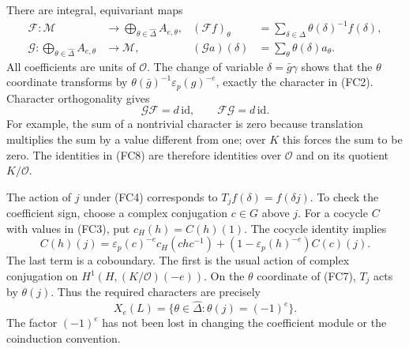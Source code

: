 There are integral, equivariant maps
\[
 \begin{aligned}
 \mathcal F:\mathcal M&\longrightarrow
                         \bigoplus_{\theta\in\widehat\Delta}A_{e,\theta},
 &(\mathcal F f)_\theta
       &=\sum_{\delta\in\Delta}\theta(\delta)^{-1}f(\delta),\\
 \mathcal G:\bigoplus_{\theta\in\widehat\Delta}A_{e,\theta}
                 &\longrightarrow\mathcal M,
 &(\mathcal G a)(\delta)&=\sum_\theta\theta(\delta)a_\theta.
 \end{aligned}                                                 \tag{FC7}
\]
All coefficients are units of $\mathcal O$. The change of
variable $\delta=\bar g\gamma$ shows that the $\theta$
coordinate transforms by
$\theta(\bar g)^{-1}\varepsilon_p(g)^{-e}$, exactly the
character in (FC2). Character orthogonality gives
\[
                    \mathcal G\mathcal F=d\,\mathrm{id},
             \qquad \mathcal F\mathcal G=d\,\mathrm{id}.
                                                               \tag{FC8}
\]
For example, the sum of a nontrivial character is zero
because translation multiplies the sum by a value different
from one; over $K$ this forces the sum to be zero. The
identities in (FC8) are therefore identities over
$\mathcal O$ and on its quotient $K/\mathcal O$.

The action of $j$ under (FC4) corresponds to
$T_jf(\delta)=f(\delta j)$. To check the coefficient sign,
choose a complex conjugation $c\in G$ above $j$.
For a cocycle $C$ with values in (FC3), put
$c_H(h)=C(h)(1)$. The cocycle identity implies
\[
 C(h)(j)=\varepsilon_p(c)^{-e}c_H(chc^{-1})
                      +(1-\varepsilon_p(h)^{-e})C(c)(j).
                                                               \tag{FC9}
\]
The last term is a coboundary. The first is the usual
action of complex conjugation on $H^1(H,(K/\mathcal O)(-e))$.
On the $\theta$ coordinate of (FC7), $T_j$ acts by
$\theta(j)$. Thus the required characters are precisely
\[
                 X_e(L)=\{\theta\in\widehat\Delta:
                                      \theta(j)=(-1)^e\}.
                                                               \tag{FC10}
\]
The factor $(-1)^e$ has not been lost in changing the
coefficient module or the coinduction convention.

